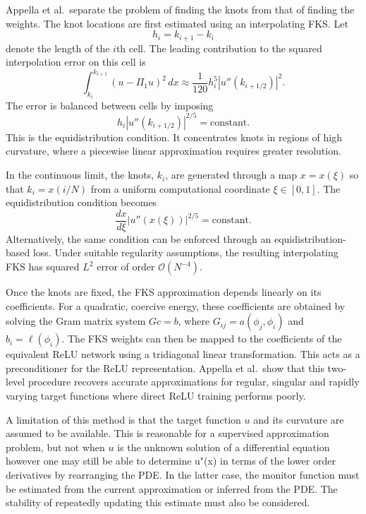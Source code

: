 \documentclass[11pt, onecolumn]{report}
\begin{document}
Appella et al.\ separate the problem of finding the knots from that of finding the weights. The knot locations are first estimated using an interpolating FKS. Let
\begin{equation*}
    h_i=k_{i+1}-k_i
\end{equation*}
denote the length of the $i$th cell. The leading contribution to the squared interpolation error on this cell is
\begin{equation*}
    \int_{k_i}^{k_{i+1}}
    \left(u-\Pi_1u\right)^2\,dx
    \approx
    \frac{1}{120}h_i^5
    \left|u''(k_{i+1/2})\right|^2.
\end{equation*}
The error is balanced between cells by imposing
\begin{equation*}
    h_i\left|u''(k_{i+1/2})\right|^{2/5}
    =
    \text{constant}.
\end{equation*}
This is the equidistribution condition. It concentrates knots in regions of high curvature, where a piecewise linear approximation requires greater resolution.

In the continuous limit, the knots, $k_i$, are generated through a map $x=x(\xi)$ so that $k_i = x(i/N)$ from a uniform computational coordinate $\xi\in[0,1]$. The equidistribution condition becomes
\begin{equation*}
    \frac{dx}{d\xi}
    \left|u''(x(\xi))\right|^{2/5}
    =
    \text{constant}.
\end{equation*}
Alternatively, the same condition can be enforced through an equidistribution-based loss. Under suitable regularity assumptions, the resulting interpolating FKS has squared $L^2$ error of order $\mathcal{O}(N^{-4})$.

Once the knots are fixed, the FKS approximation depends linearly on its coefficients. For a quadratic, coercive energy, these coefficients are obtained by solving the Gram matrix system $Gc=b$, where $G_{ij}=a(\phi_j,\phi_i)$ and $b_i=\ell(\phi_i)$. The FKS weights can then be mapped to the coefficients of the equivalent ReLU network using a tridiagonal linear transformation. This acts as a preconditioner for the ReLU representation. Appella et al.\ show that this two-level procedure recovers accurate approximations for regular, singular and rapidly varying target functions where direct ReLU training performs poorly.

A limitation of this method is that the target function $u$ and its curvature are assumed to be available. This is reasonable for a supervised approximation problem, but not when $u$ is the unknown solution of a differential equation however one may still be able to determine u"(x) in terms of the lower order derivatives by rearranging the PDE. In the latter case, the monitor function must be estimated from the current approximation or inferred from the PDE. The stability of repeatedly updating this estimate must also be considered.
\end{document}
